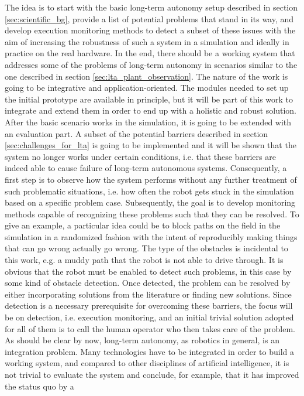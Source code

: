 \documentclass[english, master, utf8]{base/thesis_KBS}
\begin{document}
The idea is to start with the basic long-term autonomy setup described in section \ref{sec:scientific_bg}, provide a list of potential problems that 
stand in its way, and develop execution monitoring methods to detect a subset of these issues with the aim of increasing the robustness of such a system in a simulation
and ideally in practice on the real hardware. In the end, there should be a working system that addresses some of the problems of long-term autonomy 
in scenarios similar to the one described in section \ref{sec:lta_plant_observation}. The nature of the work is going to be integrative and application-oriented. The modules 
needed to set up the initial prototype are available in principle, but it will be part of this work to integrate and extend them in order to end up with a holistic and robust
solution. After the basic scenario works in the simulation, it is going to be extended with an evaluation part. A subset of the potential barriers described in section 
\ref{sec:challenges_for_lta} is going to be implemented and it will be shown that the system no longer works under certain conditions, i.e. that these
barriers are indeed able to cause failure of long-term autonomous systems. Consequently, a first step is to observe how the system performs without any further 
treatment of such problematic situations, i.e. how often the robot gets stuck in the simulation based on a specific problem case.
Subsequently, the goal is to develop monitoring methods capable of recognizing these problems such that they can be resolved.
To give an example, a particular idea could be to block paths on the field in the simulation in a randomized fashion with the intent of reproducibly making things that 
can go wrong actually go wrong. The type of the obstacles is incidental to this work, e.g. a muddy path that the robot is not able to drive through. 
It is obvious that the robot must be enabled to detect such problems, in this case by some kind of obstacle detection.
Once detected, the problem can be resolved by either incorporating solutions from the literature or finding new solutions.
Since detection is a necessary prerequisite for overcoming these barriers, the focus will be on detection, i.e. execution monitoring,
and an initial trivial solution adopted for all of them is to call the human operator who then takes care of the problem.\newline
As should be clear by now, long-term autonomy, as robotics in general, is an integration problem. Many technologies have to be integrated in order to build a working system, 
and compared to other disciplines of artificial intelligence, it is not trivial to evaluate the system and conclude, for example, that it has improved the status quo by a 
\end{document}
